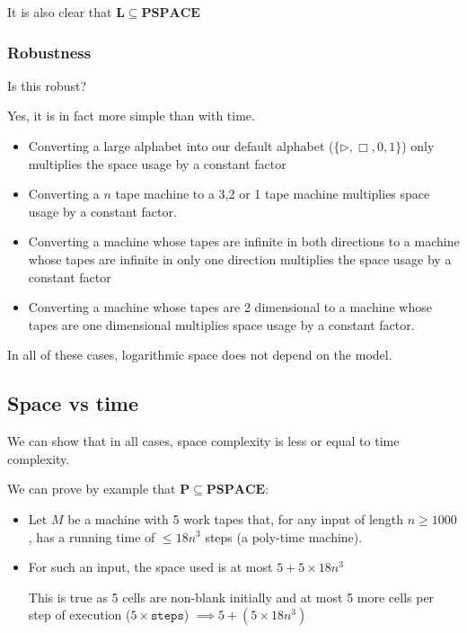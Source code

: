 \documentclass{article}
\begin{document}
  It is also clear that $\mathbf{L} \subseteq \mathbf{PSPACE} $

  \subsubsection{Robustness}

  Is this robust?

  Yes, it is in fact more simple than with time.

  \begin{itemize}
    \item Converting a large alphabet into our default alphabet ($\{ \rhd, \Box, 0,1 \} $) only multiplies the space usage by a constant factor

    \item Converting a $n$ tape machine to a 3,2 or 1 tape machine multiplies space usage by a constant factor.

    \item Converting a machine whose tapes are infinite in both directions to a machine whose tapes are infinite in only one direction multiplies the space usage by a constant factor

    \item Converting a machine whose tapes are 2 dimensional to a machine whose tapes are one dimensional multiplies space usage by a constant factor.

  \end{itemize}

  In all of these cases, logarithmic space does not depend on the model.

  \subsection{Space vs time}

  We can show that in all cases, space complexity is less or equal to time complexity.

  We can prove by example that $\mathbf{P} \subseteq \mathbf{PSPACE} $:

  \begin{itemize}
    \item Let $M$ be a machine with 5 work tapes that, for any input of length $n \geq 1000$, has a running time of $\leq 18n^{3}$ steps (a poly-time machine).
    \item For such an input, the space used is at most $5+5\times 18n^{3}$

          This is true as 5 cells are non-blank initially  and at most 5 more cells per step of execution ($5 \times \texttt{steps}$) $\implies 5 + (5 \times 18n^{3})$
  \end{itemize}
\end{document}
